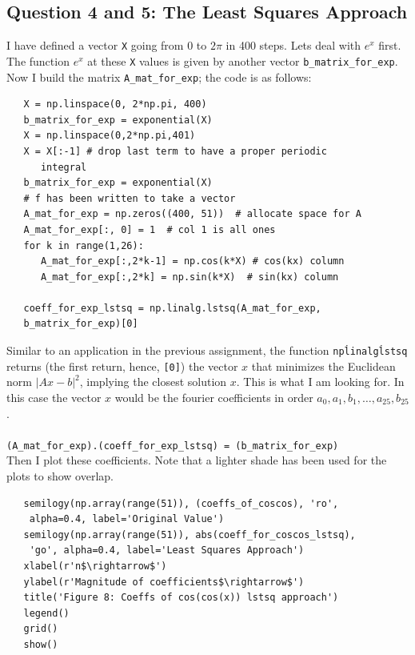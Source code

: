 \documentclass[11pt, a4paper]{article}
\begin{document}
   \subsection{Question 4 and 5: The Least Squares Approach}
   I have defined a vector \texttt{X} going from 0 to $2\pi$ in 400 steps. Lets deal with $e^x$ first. The function $e^x$ at these \texttt{X} values is given by another vector \texttt{b\_matrix\_for\_exp}. Now I build the matrix \texttt{A\_mat\_for\_exp}; the code is as follows:
   \begin{verbatim}
   X = np.linspace(0, 2*np.pi, 400)
   b_matrix_for_exp = exponential(X)
   X = np.linspace(0,2*np.pi,401)
   X = X[:-1] # drop last term to have a proper periodic 
      integral
   b_matrix_for_exp = exponential(X)  
   # f has been written to take a vector
   A_mat_for_exp = np.zeros((400, 51))  # allocate space for A
   A_mat_for_exp[:, 0] = 1  # col 1 is all ones
   for k in range(1,26):
      A_mat_for_exp[:,2*k-1] = np.cos(k*X) # cos(kx) column
      A_mat_for_exp[:,2*k] = np.sin(k*X)  # sin(kx) column

   coeff_for_exp_lstsq = np.linalg.lstsq(A_mat_for_exp, 
   b_matrix_for_exp)[0]   
   \end{verbatim}
   Similar to an application in the previous assignment, the function \texttt{np\.linalg\.lstsq} returns (the first return, hence, \texttt{[0]}) the vector $x$ that minimizes the Euclidean norm $|Ax-b|^2$, implying the closest solution $x$. This is what I am looking for. In this case the vector $x$ would be the fourier coefficients in order $a_{0}, a_{1}, b_{1}, \ldots, a_{25}, b_{25}$.\\\\
   \texttt{(A\_mat\_for\_exp).(coeff\_for\_exp\_lstsq) = (b\_matrix\_for\_exp)} \\
   
   Then I plot these coefficients. Note that a lighter shade has been used for the plots to show overlap.
   
   \begin{verbatim}
   semilogy(np.array(range(51)), (coeffs_of_coscos), 'ro',
    alpha=0.4, label='Original Value')
   semilogy(np.array(range(51)), abs(coeff_for_coscos_lstsq), 
    'go', alpha=0.4, label='Least Squares Approach')
   xlabel(r'n$\rightarrow$')
   ylabel(r'Magnitude of coefficients$\rightarrow$')
   title('Figure 8: Coeffs of cos(cos(x)) lstsq approach')
   legend()
   grid()
   show()
   \end{verbatim}
   
\end{document}
